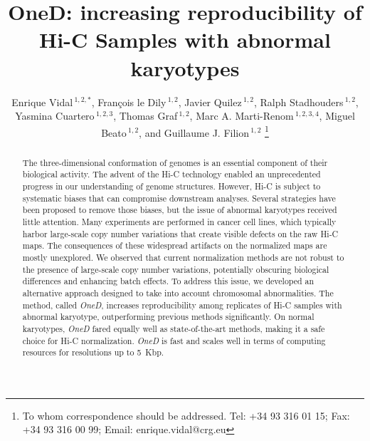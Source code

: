 \documentclass[a4,center,fleqn]{NAR}
\begin{document}
\title{OneD: increasing reproducibility of Hi-C Samples with abnormal
karyotypes}

\author{%
Enrique Vidal\,$^{1,2,*}$,
Fran\c{c}ois le Dily\,$^{1,2}$,
Javier Quilez\,$^{1,2}$,
Ralph Stadhouders\,$^{1,2}$,
Yasmina Cuartero\,$^{1,2,3}$,
Thomas Graf\,$^{1,2}$,
Marc A.  Marti-Renom\,$^{1,2,3,4}$,
Miguel Beato\,$^{1,2}$,
and Guillaume J. Filion\,$^{1,2}$%
\footnote{To whom correspondence should be addressed.
Tel: +34 93 316 01 15; Fax: +34 93 316 00 99; Email: enrique.vidal@crg.eu}}

\address{%
$^{1}$Gene Regulation, Stem Cells and Cancer Program, Centre for
Genomic Regulation (CRG), The Barcelona Institute of Science and
Technology (BIST), Dr. Aiguader 88, 08003, Barcelona, Spain
and
$^{2}$Universitat Pompeu Fabra (UPF), Barcelona, Spain
and
$^{3}$CNAG-CRG, Centre for Genomic Regulation (CRG), Barcelona
Institute of Science and Technology (BIST), Baldiri i Reixac 4, 08028
Barcelona, Spain
and
$^{4}$ICREA, Pg. Llu\'is Companys 23, 08010 Barcelona, Spain}



\maketitle

\begin{abstract}
The three-dimensional conformation of genomes is an
essential component of their biological activity. The advent of the Hi-C
technology enabled an unprecedented progress in our understanding of
genome structures. However, Hi-C is subject to systematic biases that can
compromise downstream analyses. Several strategies have been proposed to
remove those biases, but the issue of abnormal karyotypes received little
attention. Many experiments are performed in cancer cell lines, which
typically harbor large-scale copy number variations that create visible
defects on the raw Hi-C maps. The consequences of these widespread
artifacts on the normalized maps are mostly unexplored.
We observed that current normalization methods are not robust to the
presence of large-scale copy number variations, potentially obscuring
biological differences and enhancing batch effects. To address this issue,
we developed an alternative approach designed to take into account
chromosomal abnormalities. The method, called \textit{OneD}, increases
reproducibility among replicates of Hi-C samples with abnormal karyotype,
outperforming previous methods significantly. On normal karyotypes,
\textit{OneD} fared equally well as state-of-the-art methods, making it a
safe choice for Hi-C normalization.  \textit{OneD} is fast and scales well
in terms of computing resources for resolutions up to 5~Kbp.
\end{abstract}
\end{document}

